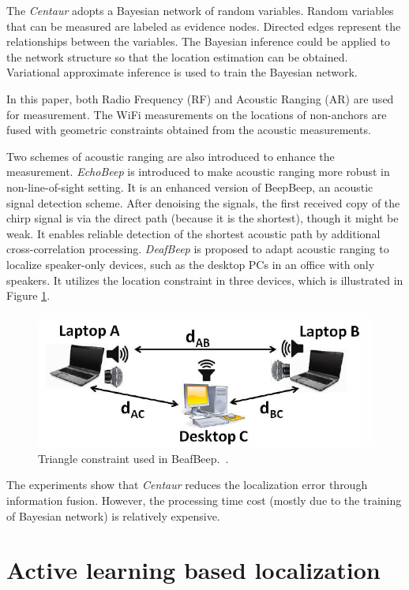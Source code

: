 \documentclass[letterpaper]{article}
\begin{document}
The \emph{Centaur} adopts a Bayesian network of random variables.
Random variables that can be measured are labeled as evidence nodes.
Directed edges represent the relationships between the variables.
The Bayesian inference could be applied to the network structure so that the location estimation can be obtained.
Variational approximate inference is used to train the Bayesian network.

In this paper, both Radio Frequency (RF) and Acoustic Ranging (AR) are used for measurement.
The WiFi measurements on the locations of non-anchors are fused with geometric constraints obtained from the acoustic measurements.

Two schemes of acoustic ranging are also introduced to enhance the measurement.
\emph{EchoBeep} is introduced to make acoustic ranging more robust in non-line-of-sight setting.
It is an enhanced version of BeepBeep, an acoustic signal detection scheme.
After denoising the signals, the first received copy of the chirp signal is via the direct path (because it is the shortest), though it might be weak.
It enables reliable detection of the shortest acoustic path by additional cross-correlation processing.
\emph{DeafBeep} is proposed to adapt acoustic ranging to localize speaker-only devices, such as the desktop PCs in an office with only speakers.
It utilizes the location constraint in three devices, which is illustrated in Figure \ref{fig:deafbeep}.
\begin{figure}
	\centering
	\includegraphics[width=0.7\linewidth]{fig/DeafBeep.png}
	\caption{Triangle constraint used in BeafBeep.~\cite{Nandakumar:2012:CLD:2348543.2348579}.}
	\label{fig:deafbeep}
\end{figure}

The experiments show that \emph{Centaur} reduces the localization error through information fusion.
However, the processing time cost (mostly due to the training of Bayesian network) is relatively expensive.

\section{Active learning based localization}
\end{document}
